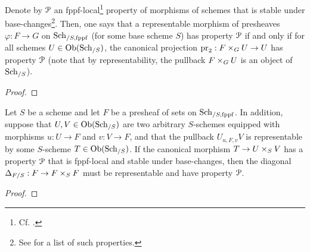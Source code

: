            \begin{definition} \label{def: properties_of_representable_morphisms_of_fppf_sheaves}
                Denote by $\mathcal{P}$ an fppf-local\footnote{Cf. \cite[\href{https://stacks.math.columbia.edu/tag/02KO}{Tag 02KO}]{stacks}.} property of morphisms of schemes that is stable under base-changes\footnote{See \cite[\href{https://stacks.math.columbia.edu/tag/02WE}{Tag 02WE}]{stacks} for a list of such properties.}. Then, one says that a representable morphism of presheaves $\varphi: F \to G$ on $\mathrm{Sch}_{/S, \mathrm{fppf}}$ (for some base scheme $S$) has property $\mathcal{P}$ if and only if for all schemes $U \in \mathrm{Ob}(\mathrm{Sch}_{/S})$, the canonical projection $\pr_2: F \x_G U \to U$ has property $\mathcal{P}$ (note that by representability, the pullback $F \x_G U$ is an object of $\mathrm{Sch}_{/S}$).
            \end{definition}
            \begin{proposition} \label{prop: permanence_of_properties_of_representable_morphisms}
                
            \end{proposition}
                \begin{proof}
                    
                \end{proof}
            \begin{lemma} \label{lemma: representability_criterion_for_diagonals}
                Let $S$ be a scheme and let $F$ be a presheaf of sets on $\mathrm{Sch}_{/S, \mathrm{fppf}}$. In addition, suppose that $U, V \in \mathrm{Ob}(\mathrm{Sch}_{/S})$ are two arbitrary $S$-schemes equipped with morphisms $u: U \to F$ and $v: V \to F$, and that the pullback $U_{u, F, v} V$ is representable by some $S$-scheme $T \in \mathrm{Ob}(\mathrm{Sch}_{/S})$. If the canonical morphism $T \to U \x_S V$ has a property $\mathcal{P}$ that is fppf-local and stable under base-changes, then the diagonal $\Delta_{F/S}: F \to F \x_S F$ must be representable and have property $\mathcal{P}$.
            \end{lemma}
                \begin{proof}
                            
                \end{proof}
                
